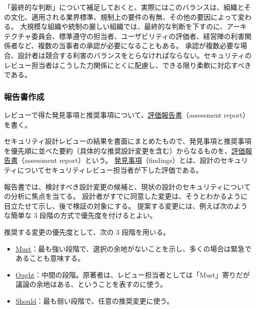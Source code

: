 \documentclass[uplatex]{jsarticle}
\def\label#1{}%
\begin{document}
\begin{rem}\label{rem:ch7-last-word}
「最終的な判断」について補足しておくと、実際にはこのバランスは、組織とその文化、適用される業界標準、規制上の要件の有無、その他の要因によって変わる。
大規模な組織や統制の厳しい組織では、最終的な判断を下すのに、アーキテクチャ委員会、標準遵守の担当者、ユーザビリティの評価者、経営陣の利害関係者など、複数の当事者の承認が必要になることもある。
承認が複数必要な場合、設計者は競合する利害のバランスをとらなければならない。セキュリティのレビュー担当者はこうした力関係にとくに配慮し、できる限り柔軟に対応すべきである。
\end{rem}

\subsubsection{報告書作成}

レビューで得た発見事項と推奨事項について、\underline{評価報告書}（assessment report）を書く。

\begin{dfn}[評価報告書]\label{dfn:ch7-assessment-report}
セキュリティ設計レビューの結果を書面にまとめたもので、発見事項と推奨事項を優先順に並べた要約（具体的な推奨設計変更を含む）からなるものを、\underline{評価報告書}（assessment report）という。
\underline{発見事項}（findings）とは、設計のセキュリティについてセキュリティレビュー担当者が下した評価である。
\end{dfn}

報告書では、検討すべき設計変更の候補と、現状の設計のセキュリティについての分析に焦点を当てる。
設計者がすでに同意した変更は、そうとわかるように目立たせて示し、後で検証の対象にする。
提案する変更には、例えば次のような簡単な 3 段階の方式で優先度を付けるとよい。

\begin{dfn}[推奨変更の優先度]\label{dfn:ch7-priority-rankings}
推奨する変更の優先度として、次の 3 段階を用いる。
\begin{itemize}
\item \underline{Must}：最も強い段階で、選択の余地がないことを示し、多くの場合は緊急であることも意味する。
\item \underline{Ought}：中間の段階。原著者は、レビュー担当者としては「Must」寄りだが議論の余地はある、ということを表すのに使う。
\item \underline{Should}：最も弱い段階で、任意の推奨変更に使う。
\end{itemize}
\end{dfn}
\end{document}

